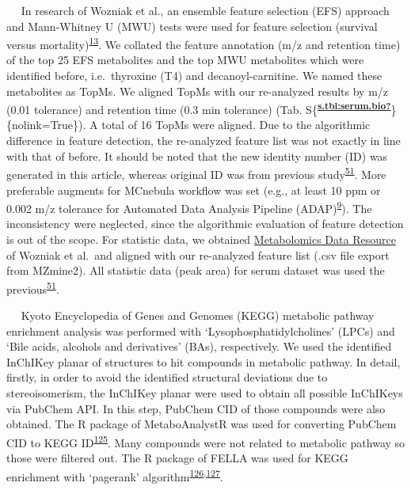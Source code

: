    In research of Wozniak et al., an ensemble feature selection (EFS)
approach and Mann-Whitney U (MWU) tests were used for feature selection
(survival versus
mortality)\textsuperscript{\protect\hyperlink{ref-2017i}{13}}. We
collated the feature annotation (m/z and retention time) of the top 25
EFS metabolites and the top MWU metabolites which were identified
before, i.e.~thyroxine (T4) and decanoyl-carnitine. We named these
metabolites as TopMs. We aligned TopMs with our re-analyzed results by
m/z (0.01 tolerance) and retention time (0.3 min tolerance) (Tab.
S\{\textsuperscript{\protect\hyperlink{ref-s.tbl:serum.bio}{\textbf{s.tbl:serum.bio?}}}\}\{nolink=True\}).
A total of 16 TopMs were aligned. Due to the algorithmic difference in
feature detection, the re-analyzed feature list was not exactly in line
with that of before. It should be noted that the new identity number
(ID) was generated in this article, whereas original ID was from
previous study\textsuperscript{\protect\hyperlink{ref-2020s}{51}}. More
preferable augments for MCnebula workflow was set (e.g., at least 10 ppm
or 0.002 m/z tolerance for Automated Data Analysis Pipeline
(ADAP)\textsuperscript{\protect\hyperlink{ref-2017f}{9}}). The
inconsistency were neglected, since the algorithmic evaluation of
feature detection is out of the scope. For statistic data, we obtained
\href{https://www.cell.com/cms/10.1016/j.cell.2020.07.040/attachment/f13178d1-d1ee-4179-9d33-227a02e604f1/mmc3.xlsx}{Metabolomics
Data Resource} of Wozniak et al.~and aligned with our re-analyzed
feature list (.csv file export from MZmine2). All statistic data (peak
area) for serum dataset was used the
previous\textsuperscript{\protect\hyperlink{ref-2020s}{51}}.

   Kyoto Encyclopedia of Genes and Genomes (KEGG) metabolic pathway
enrichment analysis was performed with `Lysophosphatidylcholines' (LPCs)
and `Bile acids, alcohols and derivatives' (BAs), respectively. We used
the identified InChIKey planar of structures to hit compounds in
metabolic pathway. In detail, firstly, in order to avoid the identified
structural deviations due to stereoisomerism, the InChIKey planar were
used to obtain all possible InChIKeys via PubChem API. In this step,
PubChem CID of those compounds were also obtained. The R package of
MetaboAnalystR was used for converting PubChem CID to KEGG
ID\textsuperscript{\protect\hyperlink{ref-2020cx}{125}}. Many compounds
were not related to metabolic pathway so those were filtered out. The R
package of FELLA was used for KEGG enrichment with `pagerank'
algorithm\textsuperscript{\protect\hyperlink{ref-2018bj}{126},\protect\hyperlink{ref-ilprints422}{127}}.

